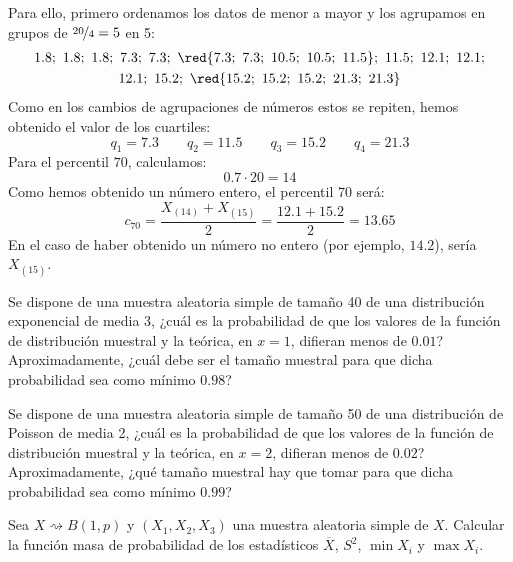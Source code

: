 \begin{ejercicio}
\begin{itemize}
            Para ello, primero ordenamos los datos de menor a mayor y los agrupamos en grupos de $\nicefrac{20}{4} = 5$ en 5:
            \begin{gather*}
                1.8;\ 1.8;\ 1.8;\ 7.3;\ 7.3;\ \red{7.3;\ 7.3;\ 10.5;\ 10.5;\ 11.5};\ 11.5;\ 12.1;\ 12.1;\\ 12.1;\ 15.2;\ \red{15.2;\ 15.2;\ 15.2;\ 21.3;\ 21.3}
            \end{gather*}
            Como en los cambios de agrupaciones de números estos se repiten, hemos obtenido el valor de los cuartiles:
            \begin{equation*}
                q_1 = 7.3 \qquad q_2 = 11.5 \qquad q_3 = 15.2 \qquad q_4 = 21.3
            \end{equation*}
            Para el percentil $70$, calculamos:
            \begin{equation*}
                0.7\cdot 20 = 14
            \end{equation*}
            Como hemos obtenido un número entero, el percentil 70 será:
            \begin{equation*}
                c_{70} = \dfrac{X_{(14)} + X_{(15)}}{2} = \dfrac{12.1 + 15.2}{2} = 13.65
            \end{equation*}
            En el caso de haber obtenido un número no entero (por ejemplo, $14.2$), sería $X_{(15)}$.
    \end{itemize}
\end{ejercicio}

\begin{ejercicio}
    Se dispone de una muestra aleatoria simple de tamaño 40 de una distribución exponencial de media 3, ¿cuál es la probabilidad de que los valores de la función de distribución muestral y la teórica, en $x=1$, difieran menos de $0.01$? Aproximadamente, ¿cuál debe ser el tamaño muestral para que dicha probabilidad sea como mínimo $0.98$?
\end{ejercicio}

\begin{ejercicio}
    Se dispone de una muestra aleatoria simple de tamaño 50 de una distribución de Poisson de media 2, ¿cuál es la probabilidad de que los valores de la función de distribución muestral y la teórica, en $x=2$, difieran menos de $0.02$? Aproximadamente, ¿qué tamaño muestral hay que tomar para que dicha probabilidad sea como mínimo $0.99$?
\end{ejercicio}

\begin{ejercicio}
   Sea $X\rightsquigarrow B(1,p)$ y $(X_1, X_2, X_3)$ una muestra aleatoria simple de $X$. Calcular la función masa de probabilidad de los estadísticos $\overline{X}$, $S^2$, $\min X_i$ y $\max X_i$.
\end{ejercicio}

